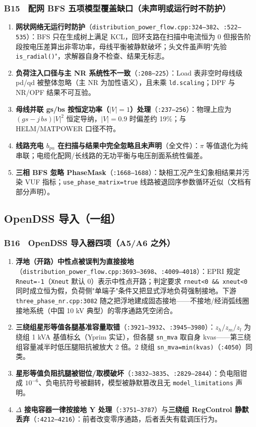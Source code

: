 \documentclass[11pt,a4paper,fontset=fandol]{ctexart}
\newcommand{\file}[1]{\texttt{#1}}
\begin{document}
\subsubsection*{B15　配网 BFS 五项模型覆盖缺口（未声明或运行时不防护）}
\begin{enumerate}
  \item \textbf{网状网络无运行时防护}（\file{distribution\_power\_flow.cpp:324--382}、\file{:522--535}）：BFS 只在生成树上满足 KCL，回环支路在扫描中电流恒为 0 但报告阶段按电压差算出非零功率，母线平衡被静默破坏；头文件虽声明"先验 \texttt{is\_radial()}"，求解器自身不检查、结果无标志。
  \item \textbf{负荷注入口径与主 NR 系统性不一致}（\file{:208--225}）：Load 表非空时母线级 pd/qd 被整体忽略（主 NR 为加性语义），且未乘 \texttt{ld.scaling}；DPF 与 NR/OPF 结果不可互验。
  \item \textbf{母线并联 gs/bs 按恒定功率（$|V|=1$）处理}（\file{:237--256}）：物理上应为 $(gs-j\,bs)|V|^2$ 恒定导纳，$|V|=0.9$ 时偏差约 19\%；与 HELM/MATPOWER 口径不符。
  \item \textbf{线路充电 $b_{pu}$ 在扫描与结果中完全忽略且未声明}（全文件）：$\pi$ 等值退化为纯串联；电缆化配网/长线路的无功平衡与电压剖面系统性偏差。
  \item \textbf{三相 BFS 忽略 PhaseMask}（\file{:1668--1688}）：缺相工况产生幻象相结果并污染 VUF 指标；\texttt{use\_phase\_matrix=true} 线路被退回序参数循环近似（文档有部分声明）。
\end{enumerate}

\subsection{OpenDSS 导入（一组）}

\subsubsection*{B16　OpenDSS 导入器四项（A5/A6 之外）}
\begin{enumerate}
  \item \textbf{浮地（开路）中性点被误判为直接接地}（\file{distribution\_power\_flow.cpp:3693--3698}、\file{:4009--4018}）：EPRI 规定 \texttt{Rneut=-1}（\texttt{Xneut} 默认 0）表示中性点开路；判定要求 \texttt{rneut<0 \&\& xneut<0} 同时成立恒为假，负荷侧"单端子"条件又把显式浮地负荷强制接地。下游 \file{three\_phase\_nr.cpp:3082} 随之把浮地建成固态接地——不接地/经消弧线圈接地系统（中国 10 kV 典型）的零序通路凭空闭合。
  \item \textbf{三绕组星形等值各腿基准容量取错}（\file{:3921--3932}、\file{:3945--3980}）：$z_h/z_m/z_l$ 为绕组 1 kVA 基值标幺（Yprim 实证），但各腿 \texttt{sn\_mva} 取自身 kvas——第三绕组容量减半时低压腿阻抗被放大 2 倍。2 绕组 \texttt{sn\_mva=min(kvas)}（\file{:4050}）同类。
  \item \textbf{星形等值负阻抗腿被钳位/取模破坏}（\file{:3832--3835}、\file{:2829--2844}）：负电阻钳成 $10^{-6}$、负电抗符号被翻转，模型被静默篡改且无 \texttt{model\_limitations} 声明。
  \item \textbf{$\Delta$ 接电容器一律按接地 Y 处理}（\file{:3751--3787}）与\textbf{三绕组 RegControl 静默丢弃}（\file{:4212--4216}）：前者改变零序通路，后者丢失有载调压行为。
\end{enumerate}
\end{document}
